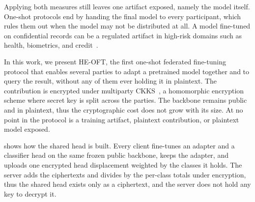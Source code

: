 
Applying both measures still leaves one artifact exposed, namely the model itself.
One-shot protocols end by handing the final model to every participant, which
rules them out when the model may not be distributed at all. A model fine-tuned on
confidential records can be a regulated artifact in high-risk domains such as
health, biometrics, and credit~\cite{euaiact2024}.

In this work, we present HE-OFT, the first one-shot federated fine-tuning protocol
that enables several parties to adapt a pretrained model together and to query the
result, without any of them ever holding it in plaintext. The contribution is encrypted under multiparty
CKKS~\cite{cheon2017ckks,mouchet2021multiparty}, a homomorphic encryption scheme
where secret key is split across the parties.
 The backbone remains public and in plaintext, thus the cryptographic cost does not grow with its size. At no point in the protocol is a training artifact, plaintext contribution, or plaintext model exposed.



 shows how the shared head is built. Every client fine-tunes an
adapter and a classifier head on the same frozen public backbone, keeps the
adapter, and uploads one encrypted head displacement weighted by the classes it
holds. The server adds the ciphertexts and divides by the per-class totals under
encryption, thus the shared head exists only as a ciphertext, and the server does not hold any
key to decrypt it.

